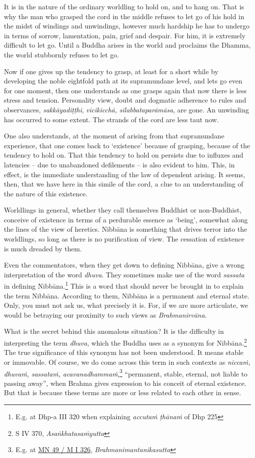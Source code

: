 It is in the nature of the ordinary worldling to hold on, and to hang on. That is why the man who grasped the cord in the middle refuses to let go of his hold in the midst of windings and unwindings, however much hardship he has to undergo in terms of sorrow, lamentation, pain, grief and despair. For him, it is extremely difficult to let go. Until a Buddha arises in the world and proclaims the Dhamma, the world stubbornly refuses to let go.

Now if one gives up the tendency to grasp, at least for a short while by developing the noble eightfold path at its supramundane level, and lets go even for one moment, then one understands as one grasps again that now there is less stress and tension. Personality view, doubt and dogmatic adherence to rules and observances, \emph{sakkāyadiṭṭhi}, \emph{vicikicchā, sīlabbataparāmāsa}, are gone. An unwinding has occurred to some extent. The strands of the cord are less taut now.

One also understands, at the moment of arising from that supramundane experience, that one comes back to `existence' because of grasping, because of the tendency to hold on. That this tendency to hold on persists due to influxes and latencies -- due to unabandoned defilements -- is also evident to him. This, in effect, is the immediate understanding of the law of dependent arising. It seems, then, that we have here in this simile of the cord, a clue to an understanding of the nature of this existence.

Worldlings in general, whether they call themselves Buddhist or non-Buddhist, conceive of existence in terms of a perdurable essence as `being', somewhat along the lines of the view of heretics. Nibbāna is something that drives terror into the worldlings, so long as there is no purification of view. The cessation of existence is much dreaded by them.

Even the commentators, when they get down to defining Nibbāna, give a wrong interpretation of the word \emph{dhuva}. They sometimes make use of the word \emph{sassata} in defining Nibbāna.\footnote{E.g. at Dhp-a III 320 when explaining \emph{accutaṁ ṭhānaṁ} of Dhp 225} This is a word that should never be brought in to explain the term Nibbāna. According to them, Nibbāna is a permanent and eternal state. Only, you must not ask us, what precisely it is. For, if we are more articulate, we would be betraying our proximity to such views as \emph{Brahmanirvāna}.

What is the secret behind this anomalous situation? It is the difficulty in interpreting the term \emph{dhuva}, which the Buddha uses as a synonym for Nibbāna.\footnote{S IV 370, \emph{Asaṅkhatasaṁyutta}} The true significance of this synonym has not been understood. It means stable or immovable. Of course, we do come across this term in such contexts as \emph{niccaṁ, dhuvaṁ, sassataṁ, acavanadhammaṁ},\footnote{E.g. at \href{https://suttacentral.net/mn49/pli/ms}{MN 49 / M I 326}, \emph{Brahmanimantanikasutta}} ``permanent, stable, eternal, not liable to passing away'', when Brahma gives expression to his conceit of eternal existence. But that is because these terms are more or less related to each other in sense.

